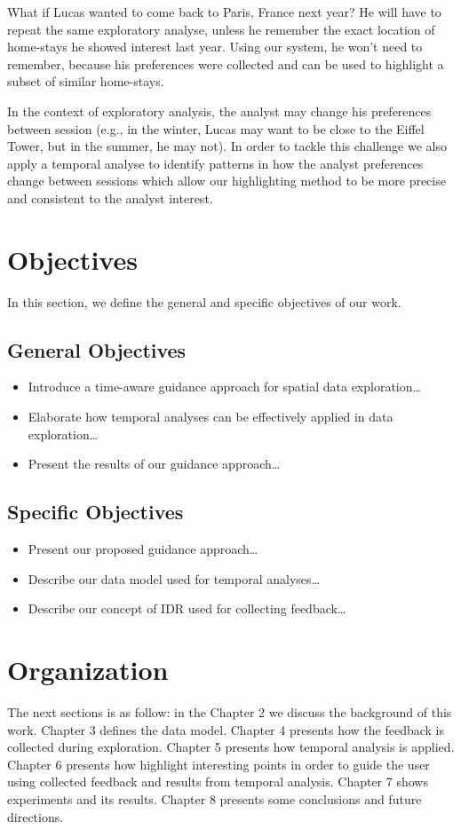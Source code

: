 What if Lucas wanted to come back to Paris, France next year? He will have to repeat the same exploratory analyse, unless he remember the exact location of home-stays he showed interest last year. Using our system, he won't need to remember, because his preferences were collected and can be used to highlight a subset of similar home-stays.

In the context of exploratory analysis, the analyst may change his preferences between session (e.g., in the winter, Lucas may want to be close to the Eiffel Tower, but in the summer, he may not). In order to tackle this challenge we also apply a temporal analyse to identify patterns in how the analyst preferences change between sessions which allow our highlighting method to be more precise and consistent to the analyst interest.

\section{Objectives}

In this section, we define the general and specific objectives of our work.

\subsection{General Objectives}

\begin{itemize}
	\item Introduce a time-aware guidance approach for spatial data exploration\ldots
	\item Elaborate how temporal analyses can be effectively applied in data exploration\ldots
	\item Present the results of our guidance approach\ldots
\end{itemize}

\subsection{Specific Objectives}

\begin{itemize}
	\item Present our proposed guidance approach\ldots
	\item Describe our data model used for temporal analyses\ldots
	\item Describe our concept of IDR used for collecting feedback\ldots
\end{itemize}

\section{Organization}

The next sections is as follow: in the Chapter 2 we discuss the background of this work. Chapter 3 defines the data model. Chapter 4 presents how the feedback is collected during exploration. Chapter 5 presents how temporal analysis is applied. Chapter 6 presents how highlight interesting points in order to guide the user using collected feedback and results from temporal analysis. Chapter 7 shows experiments and its results. Chapter 8 presents some conclusions and future directions.
